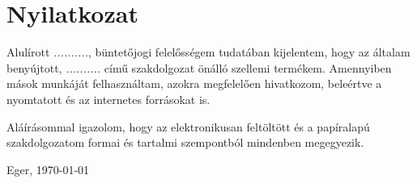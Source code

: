 \documentclass{thesis-ekf}
\begin{document}
\chapter*{Nyilatkozat}

Alulírott \emph{..........}, büntetőjogi felelősségem tudatában kijelentem, hogy az általam benyújtott, \emph{..........} című szakdolgozat önálló szellemi termékem. Amennyiben mások munkáját felhasználtam, azokra megfelelően hivatkozom, beleértve a nyomtatott és az internetes forrásokat is.

Aláírásommal igazolom, hogy az elektronikusan feltöltött és a papíralapú szakdolgozatom formai és tartalmi szempontból mindenben megegyezik.

\bigskip
\begin{flushleft}
Eger, \today
\end{flushleft}

\medskip
\begin{flushright}
\end{flushright}

%
\end{document}
